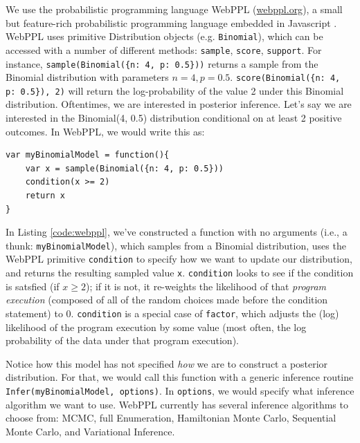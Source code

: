 \documentclass{article}
\begin{document}
We use the probabilistic programming language WebPPL (\url{webppl.org}), a small but feature-rich probabilistic programming language embedded in Javascript \cite{dippl}.
WebPPL uses primitive Distribution objects (e.g. \lstinline{Binomial}), which can be accessed with a number of different methods: \lstinline{sample}, \lstinline{score}, \lstinline{support}.
For instance, \lstinline|sample(Binomial({n: 4, p: 0.5}))| returns a sample from the Binomial distribution with parameters $n=4, p = 0.5$. \lstinline|score(Binomial({n: 4, p: 0.5}), 2)| will return the log-probability of the value 2 under this Binomial distribution.
Oftentimes, we are interested in posterior inference. Let's say we are interested in the Binomial(4, 0.5) distribution conditional on at least 2 positive outcomes. In WebPPL, we would write this as:
%
\begin{lstlisting}[mathescape, label={code:webppl}, caption = {Posterior inference in WebPPL.}]
var myBinomialModel = function(){
	var x = sample(Binomial({n: 4, p: 0.5}))
	condition(x >= 2)
	return x
}
\end{lstlisting}
%
In Listing \ref{code:webppl}, we've constructed a function with no arguments (i.e., a thunk: \lstinline{myBinomialModel}), which samples from a Binomial distribution, uses the WebPPL primitive \lstinline{condition} to specify how we want to update our distribution, and returns the resulting sampled value \lstinline{x}.
\lstinline{condition} looks to see if the condition is satsfied (if $x\geq2$); if it is not, it re-weights the likelihood of that \emph{program execution} (composed of all of the random choices made before the condition statement) to 0.
\lstinline{condition} is a special case of \lstinline{factor}, which adjusts the (log) likelihood of the program execution by some value (most often, the log probability of the data under that program execution).

Notice how this model has not specified \emph{how} we are to construct a posterior distribution. For that, we would call this function with a generic inference routine \lstinline{Infer(myBinomialModel, options)}. In \lstinline{options}, we would specify what inference algorithm we want to use. WebPPL currently has several inference algorithms to choose from: MCMC, full Enumeration, Hamiltonian Monte Carlo, Sequential Monte Carlo, and Variational Inference.
\end{document}
